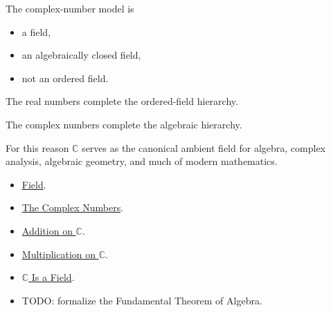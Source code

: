 
\begin{remark*}

The complex-number model is

\begin{itemize}
    \item a field,
    \item an algebraically closed field,
    \item not an ordered field.
\end{itemize}

The real numbers complete the ordered-field hierarchy.

The complex numbers complete the algebraic hierarchy.

For this reason $\mathbb C$ serves as the canonical ambient field for algebra,
complex analysis, algebraic geometry, and much of modern mathematics.

\end{remark*}

\begin{dependencies}

\begin{itemize}
    \item \hyperref[def:algebraic-field]{Field}.
    \item \hyperref[def:complex-numbers]{The Complex Numbers}.
    \item \hyperref[def:addition-on-c-classes]{Addition on $\mathbb C$}.
    \item \hyperref[def:multiplication-on-c-classes]{Multiplication on $\mathbb C$}.
    \item \hyperref[thm:c-is-a-field]{$\mathbb C$ Is a Field}.
    \item TODO: formalize the Fundamental Theorem of Algebra.
\end{itemize}

\end{dependencies}
